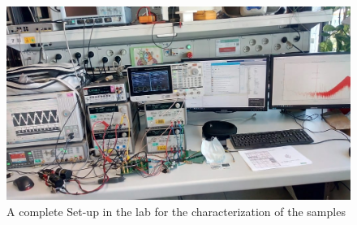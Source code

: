 %
\begin{figure}[h!]
    \centering
    \includegraphics[width=\columnwidth]{Chap06/Figures/lab_setup.jpeg}
    \caption{A complete Set-up in the lab for the characterization of the samples}
    \label{fig:char_setup}
\end{figure}
%

